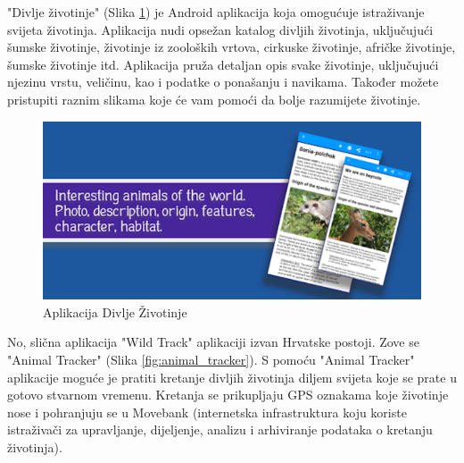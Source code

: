 	"Divlje životinje" (Slika \ref{fig:divlje_zivotinje}) je Android aplikacija koja omogućuje istraživanje svijeta životinja. 
	Aplikacija nudi opsežan katalog divljih životinja, uključujući šumske životinje, životinje iz zooloških vrtova, cirkuske životinje, afričke životinje, šumske životinje itd. 
	Aplikacija pruža detaljan opis svake životinje, uključujući njezinu vrstu, veličinu, kao i podatke o ponašanju i navikama. 
	Također možete pristupiti raznim slikama koje će vam pomoći da bolje razumijete životinje. 

	\begin{figure}[H]
		\includegraphics[scale=0.4]{slike/divlje_zivotinje.png} %
		\centering
		\caption{Aplikacija Divlje Životinje}
		\label{fig:divlje_zivotinje}
	\end{figure}

	No, slična aplikacija "Wild Track" aplikaciji izvan Hrvatske postoji. Zove se "Animal Tracker" (Slika \ref{fig:animal_tracker}). 
	S pomoću "Animal Tracker" aplikacije moguće je pratiti kretanje divljih životinja diljem svijeta koje se prate u gotovo stvarnom vremenu.
	Kretanja se prikupljaju GPS oznakama koje životinje nose i pohranjuju se u Movebank (internetska infrastruktura koju koriste istraživači za upravljanje, dijeljenje, analizu i arhiviranje podataka o kretanju životinja).


